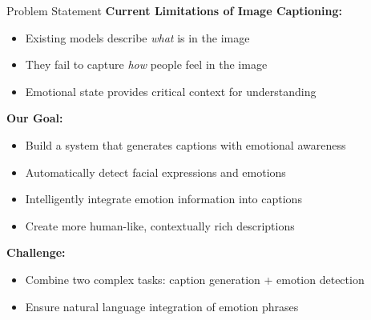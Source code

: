 \documentclass{beamer}
\begin{document}

\begin{frame}{Problem Statement}
    \textbf{Current Limitations of Image Captioning:}
    \begin{itemize}
        \item Existing models describe \textit{what} is in the image
        \item They fail to capture \textit{how} people feel in the image
        \item Emotional state provides critical context for understanding
    \end{itemize}
    
    \vspace{0.5cm}
    \textbf{Our Goal:}
    \begin{itemize}
        \item Build a system that generates captions with emotional awareness
        \item Automatically detect facial expressions and emotions
        \item Intelligently integrate emotion information into captions
        \item Create more human-like, contextually rich descriptions
    \end{itemize}
    
    \vspace{0.5cm}
    \textbf{Challenge:}
    \begin{itemize}
        \item Combine two complex tasks: caption generation + emotion detection
        \item Ensure natural language integration of emotion phrases
    \end{itemize}
\end{frame}
\end{document}
